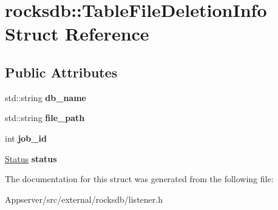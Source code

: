 \hypertarget{structrocksdb_1_1TableFileDeletionInfo}{}\section{rocksdb\+:\+:Table\+File\+Deletion\+Info Struct Reference}
\label{structrocksdb_1_1TableFileDeletionInfo}
\subsection*{Public Attributes}
\begin{DoxyCompactItemize}
\item 
std\+::string {\bfseries db\+\_\+name}\hypertarget{structrocksdb_1_1TableFileDeletionInfo_af0255c75fc7fbb24ff41979744e855a1}{}\label{structrocksdb_1_1TableFileDeletionInfo_af0255c75fc7fbb24ff41979744e855a1}

\item 
std\+::string {\bfseries file\+\_\+path}\hypertarget{structrocksdb_1_1TableFileDeletionInfo_a6b3360d82ca241842343da56726f126f}{}\label{structrocksdb_1_1TableFileDeletionInfo_a6b3360d82ca241842343da56726f126f}

\item 
int {\bfseries job\+\_\+id}\hypertarget{structrocksdb_1_1TableFileDeletionInfo_a4ed3973f9358c1dec30c6ac2713bcd9b}{}\label{structrocksdb_1_1TableFileDeletionInfo_a4ed3973f9358c1dec30c6ac2713bcd9b}

\item 
\hyperlink{classrocksdb_1_1Status}{Status} {\bfseries status}\hypertarget{structrocksdb_1_1TableFileDeletionInfo_ae4f17331256c4f554fa057cf00e65bf8}{}\label{structrocksdb_1_1TableFileDeletionInfo_ae4f17331256c4f554fa057cf00e65bf8}

\end{DoxyCompactItemize}


The documentation for this struct was generated from the following file\+:\begin{DoxyCompactItemize}
\item 
Appserver/src/external/rocksdb/listener.\+h\end{DoxyCompactItemize}
